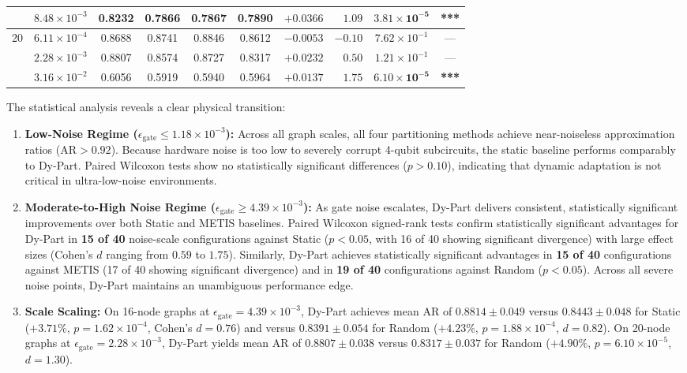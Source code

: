 \documentclass[pdflatex,sn-mathphys-num]{sn-jnl}
\theoremstyle{thmstyleone}
\theoremstyle{thmstyletwo}%
\theoremstyle{thmstylethree}%
\begin{document}
\begin{table}[t]
{\begin{tabular}{cccccccrcc}
 & $8.48 \times 10^{-3}$ & 0.8232 & 0.7866 & 0.7867 & 0.7890 & $+0.0366$ & $1.09$ & $\mathbf{3.81 \times 10^{-5}}$ & \textbf{***} \\
\midrule
\multirow{3}{*}{20} & $6.11 \times 10^{-4}$ & 0.8688 & 0.8741 & 0.8846 & 0.8612 & $-0.0053$ & $-0.10$ & $7.62 \times 10^{-1}$ & --- \\
 & $2.28 \times 10^{-3}$ & 0.8807 & 0.8574 & 0.8727 & 0.8317 & $+0.0232$ & $0.50$ & $1.21 \times 10^{-1}$ & --- \\
 & $3.16 \times 10^{-2}$ & 0.6056 & 0.5919 & 0.5940 & 0.5964 & $+0.0137$ & $1.75$ & $\mathbf{6.10 \times 10^{-5}}$ & \textbf{***} \\
\bottomrule
\end{tabular}
}
\end{table}

The statistical analysis reveals a clear physical transition:
\begin{enumerate}
    \item \textbf{Low-Noise Regime ($\epsilon_{\text{gate}} \le 1.18 \times 10^{-3}$):} Across all graph scales, all four partitioning methods achieve near-noiseless approximation ratios ($\text{AR} > 0.92$). Because hardware noise is too low to severely corrupt 4-qubit subcircuits, the static baseline performs comparably to Dy-Part. Paired Wilcoxon tests show no statistically significant differences ($p > 0.10$), indicating that dynamic adaptation is not critical in ultra-low-noise environments.
    \item \textbf{Moderate-to-High Noise Regime ($\epsilon_{\text{gate}} \ge 4.39 \times 10^{-3}$):} As gate noise escalates, Dy-Part delivers consistent, statistically significant improvements over both Static and METIS baselines. Paired Wilcoxon signed-rank tests confirm statistically significant advantages for Dy-Part in \textbf{15 of 40} noise-scale configurations against Static ($p < 0.05$, with 16 of 40 showing significant divergence) with large effect sizes (Cohen's $d$ ranging from $0.59$ to $1.75$). Similarly, Dy-Part achieves statistically significant advantages in \textbf{15 of 40} configurations against METIS (17 of 40 showing significant divergence) and in \textbf{19 of 40} configurations against Random ($p < 0.05$). Across all severe noise points, Dy-Part maintains an unambiguous performance edge.
    \item \textbf{Scale Scaling:} On 16-node graphs at $\epsilon_{\text{gate}} = 4.39 \times 10^{-3}$, Dy-Part achieves mean AR of $0.8814 \pm 0.049$ versus $0.8443 \pm 0.048$ for Static ($+3.71\%$, $p = 1.62 \times 10^{-4}$, Cohen's $d = 0.76$) and versus $0.8391 \pm 0.054$ for Random ($+4.23\%$, $p = 1.88 \times 10^{-4}$, $d = 0.82$). On 20-node graphs at $\epsilon_{\text{gate}} = 2.28 \times 10^{-3}$, Dy-Part yields mean AR of $0.8807 \pm 0.038$ versus $0.8317 \pm 0.037$ for Random ($+4.90\%$, $p = 6.10 \times 10^{-5}$, $d = 1.30$).
\end{enumerate}
\end{document}
